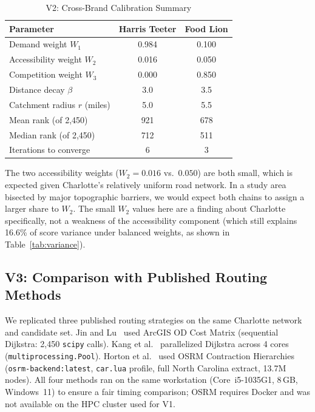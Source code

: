 \documentclass[conference]{IEEEtran}
\begin{document}
\begin{table}[!t]
\centering
\caption{V2: Cross-Brand Calibration Summary}
\label{tab:v2_crossbrand}
\begin{tabular}{lcc}
\toprule
\textbf{Parameter} & \textbf{Harris Teeter} & \textbf{Food Lion} \\
\midrule
Demand weight $W_1$          & 0.984 & 0.100 \\
Accessibility weight $W_2$   & 0.016 & 0.050 \\
Competition weight $W_3$     & 0.000 & 0.850 \\
Distance decay $\beta$       & 3.0   & 3.5   \\
Catchment radius $r$ (miles) & 5.0   & 5.5   \\
Mean rank (of 2,450)         & 921   & 678   \\
Median rank (of 2,450)       & 712   & 511   \\
Iterations to converge       & 6     & 3     \\
\bottomrule
\end{tabular}
\end{table}

The two accessibility weights ($W_2 = 0.016$ vs.\ $0.050$) are both
small, which is expected given Charlotte's relatively uniform road
network. In a study area bisected by major topographic barriers, we
would expect both chains to assign a larger share to $W_2$. The small
$W_2$ values here are a finding about Charlotte specifically, not a
weakness of the accessibility component (which still explains 16.6\%
of score variance under balanced weights, as shown in
Table~\ref{tab:variance}).

\subsection{V3: Comparison with Published Routing Methods}
\label{sec:v3}

We replicated three published routing strategies on the same Charlotte
network and candidate set. Jin and Lu~\cite{Jin2022} used ArcGIS OD
Cost Matrix (sequential Dijkstra: 2{,}450 \texttt{scipy} calls).
Kang et al.~\cite{Kang2020} parallelized Dijkstra across 4 cores
(\texttt{multiprocessing.Pool}). Horton et al.~\cite{Horton2025}
used OSRM Contraction Hierarchies~\cite{Luxen2011}
(\texttt{osrm-backend:latest}, \texttt{car.lua} profile, full North
Carolina extract, 13.7M nodes). All four methods ran on the same
workstation (Core~i5-1035G1, 8\,GB, Windows~11) to ensure a fair
timing comparison; OSRM requires Docker and was not available on the
HPC cluster used for V1.
\end{document}

